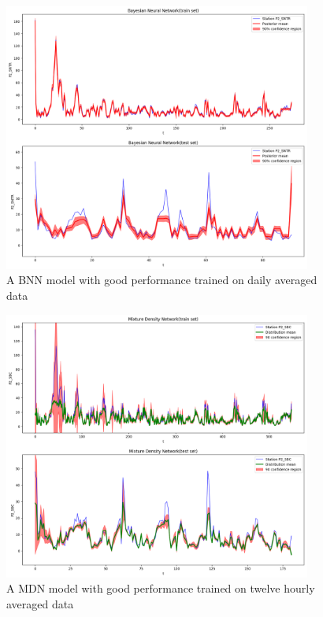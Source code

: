 \documentclass[12pt,a4paper,twoside]{scrartcl}
\numberwithin{equation}{section}
\newcounter{mypagecount}%
\newenvironment{interlude}{%
  \clearpage
  \setcounter{mypagecount}{\value{page}}%
  \thispagestyle{empty}%
  \pagestyle{empty}%
}{%
  \clearpage
  \setcounter{page}{\value{mypagecount}}%
}
\begin{document}
\begin{interlude}
\begin{appendices}
\begin{center}
\begin{figure}[h!]
        \centering
        \includegraphics[height=0.6\textwidth, width=0.9\textwidth]{figures/model_plots/bnn_1d}
        \caption[BNN one day plot]{A BNN model with good performance trained on daily averaged data}\label{fig:bnn-plot-1d}
      \end{figure}
    \end{center}
    \begin{center}
      \begin{figure}[h!]
        \centering
        \includegraphics[height=0.6\textwidth, width=0.9\textwidth]{figures/model_plots/mdn_12h}
        \caption[MDN twelve hours plot]{A MDN model with good performance trained on twelve hourly averaged data}\label{fig:mdn-plot-12h}
      \end{figure}
    \end{center}
    \begin{center}
      \begin{figure}[h!]
        \centering

\end{figure}
\end{center}
\end{appendices}
\end{interlude}
\end{document}

